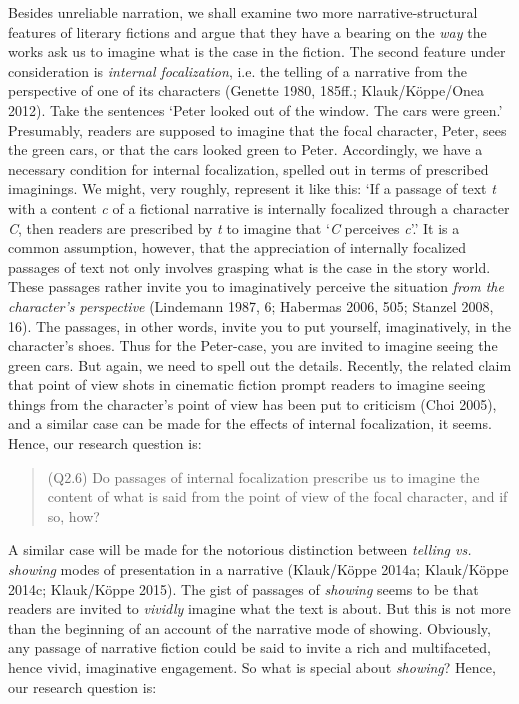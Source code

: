 \noindent Besides unreliable narration, we shall examine two more
narrative-structural features of literary fictions and argue that they
have a bearing on the \emph{way} the works ask us to imagine what is the
case in the fiction. The second feature under consideration is
\emph{internal focalization}, i.e. the telling of a narrative from the
perspective of one of its characters (Genette 1980, 185ff.;
Klauk/K\"oppe/Onea 2012). Take the sentences `Peter looked out of the
window. The cars were green.' Presumably, readers are supposed to
imagine that the focal character, Peter, sees the green cars, or that
the cars looked green to Peter. Accordingly, we have a necessary
condition for internal focalization, spelled out in terms of prescribed
imaginings. We might, very roughly, represent it like this: `If a
passage of text \emph{t} with a content \emph{c} of a fictional
narrative is internally focalized through a character \emph{C}, then
readers are prescribed by \emph{t} to imagine that `\emph{C} perceives
\emph{c}'.' It is a common assumption, however, that the appreciation of
internally focalized passages of text not only involves grasping what is
the case in the story world. These passages rather invite you to
imaginatively perceive the situation \emph{from the character's
perspective} (Lindemann 1987, 6; Habermas 2006, 505; Stanzel 2008, 16).
The passages, in other words, invite you to put yourself, imaginatively,
in the character's shoes. Thus for the Peter-case, you are invited to
imagine seeing the green cars. But again, we need to spell out the
details. Recently, the related claim that point of view shots in
cinematic fiction prompt readers to imagine seeing things from the
character's point of view has been put to criticism (Choi 2005), and a
similar case can be made for the effects of internal focalization, it
seems. Hence, our research question is:

\vspace{-.2cm}
\begin{quote}
(Q2.6) Do passages of internal focalization prescribe us to imagine
the content of what is said from  the point of view of the focal
character, and if so, how? 
\end{quote}
\vspace{-.2cm}

\noindent A similar case will be made for the notorious distinction between
\emph{telling vs. showing} modes of presentation in a narrative
(Klauk/K\"oppe 2014a; Klauk/K\"oppe 2014c; Klauk/K\"oppe 2015). The gist of
passages of \emph{showing} seems to be that readers are invited to
\emph{vividly} imagine what the text is about. But this is not more than
the beginning of an account of the narrative mode of showing. Obviously,
any passage of narrative fiction could be said to invite a rich and
multifaceted, hence vivid, imaginative engagement. So what is special
about \emph{showing}? Hence, our research question is:

